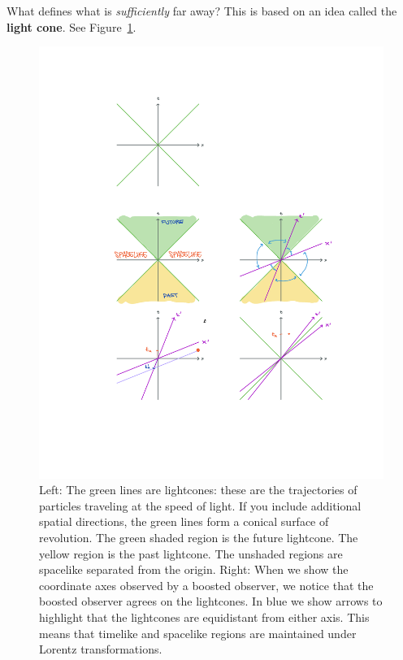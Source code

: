 What defines what is \emph{sufficiently} far away? This is based on an idea called the \textbf{light cone}. See Figure~\ref{fig:lightcone}.
\begin{figure}[ht]
\includegraphics[width=.8\textwidth]{figures/spacetime_lightcone.pdf}
    \caption{Left: The green lines are lightcones: these are the trajectories of particles traveling at the speed of light. If you include additional spatial directions, the green lines form a conical surface of revolution. The green shaded region is the future lightcone. The yellow region is the past lightcone. The unshaded regions are spacelike separated from the origin. Right: When we show the coordinate axes observed by a boosted observer, we notice that the boosted observer agrees on the lightcones. In blue we show arrows to highlight that the lightcones are equidistant from either axis. This means that timelike and spacelike regions are maintained under Lorentz transformations.}
    \label{fig:lightcone}
\end{figure}
